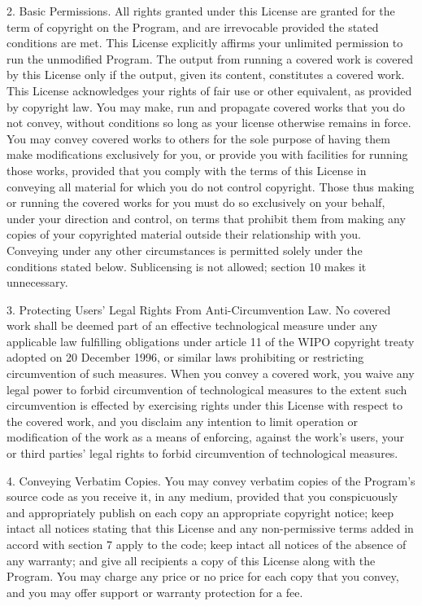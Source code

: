\documentclass {scrbook}
\begin{document}
\begin{tiny}
2. Basic Permissions. All rights granted under this License are granted for the term of copyright on the Program, and are irrevocable provided the stated conditions are met. This License explicitly affirms your unlimited permission to run the unmodified Program. The output from running a covered work is covered by this License only if the output, given its content, constitutes a covered work. This License acknowledges your rights of fair use or other equivalent, as provided by copyright law. You may make, run and propagate covered works that you do not convey, without conditions so long as your license otherwise remains in force. You may convey covered works to others for the sole purpose of having them make modifications exclusively for you, or provide you with facilities for running those works, provided that you comply with the terms of this License in conveying all material for which you do not control copyright. Those thus making or running the covered works for you must do so exclusively on your behalf, under your direction and control, on terms that prohibit them from making any copies of your copyrighted material outside their relationship with you. Conveying under any other circumstances is permitted solely under the conditions stated below. Sublicensing is not allowed; section 10 makes it unnecessary.

3. Protecting Users' Legal Rights From Anti-Circumvention Law. No covered work shall be deemed part of an effective technological measure under any applicable law fulfilling obligations under article 11 of the WIPO copyright treaty adopted on 20 December 1996, or similar laws prohibiting or restricting circumvention of such measures. When you convey a covered work, you waive any legal power to forbid circumvention of technological measures to the extent such circumvention is effected by exercising rights under this License with respect to the covered work, and you disclaim any intention to limit operation or modification of the work as a means of enforcing, against the work's users, your or third parties' legal rights to forbid circumvention of technological measures.

4. Conveying Verbatim Copies. You may convey verbatim copies of the Program's source code as you receive it, in any medium, provided that you conspicuously and appropriately publish on each copy an appropriate copyright notice; keep intact all notices stating that this License and any non-permissive terms added in accord with section 7 apply to the code; keep intact all notices of the absence of any warranty; and give all recipients a copy of this License along with the Program. You may charge any price or no price for each copy that you convey, and you may offer support or warranty protection for a fee.


\end{tiny}
\end{document}
